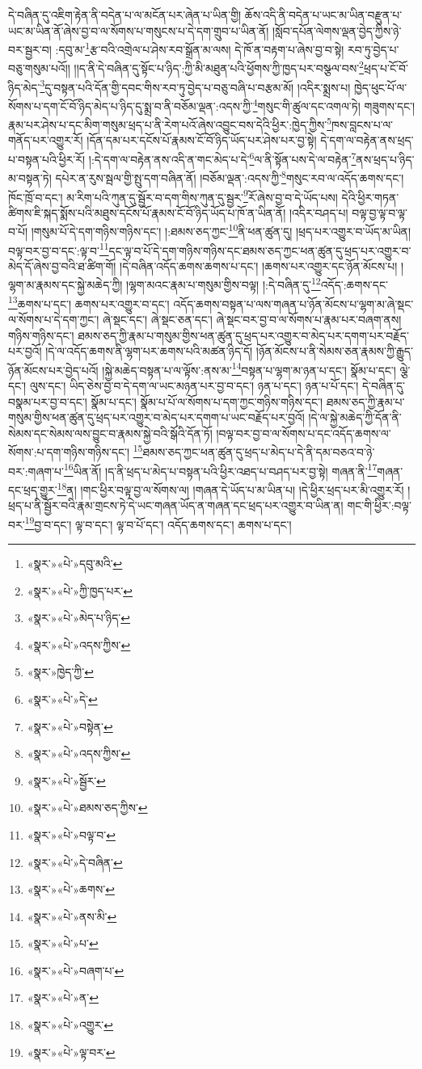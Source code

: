 དེ་བཞིན་དུ་འཇིག་རྟེན་ནི་བདེན་པ་ལ་མངོན་པར་ཞེན་པ་ཡིན་གྱི། ཆོས་འདི་ནི་བདེན་པ་ཡང་མ་ཡིན་བརྫུན་པ་ཡང་མ་ཡིན་ནོ་ཞེས་བྱ་བ་ལ་སོགས་པ་གསུངས་པ་དེ་དག་གྲུབ་པ་ཡིན་ནོ། །སློབ་དཔོན་ལེགས་ལྡན་བྱེད་ཀྱིས་ཉེ་བར་སྦྱར་བ། :དབུ་མ་\footnote{«སྣར་»«པེ་»དབུ་མའི་}རྩ་བའི་འགྲེལ་པ་ཤེས་རབ་སྒྲོན་མ་ལས། དེ་ཁོ་ན་བརྟག་པ་ཞེས་བྱ་བ་སྟེ། རབ་ཏུ་བྱེད་པ་བཅུ་གསུམ་པའོ།། །།ད་ནི་དེ་བཞིན་དུ་སྟོང་པ་ཉིད་:ཀྱི་མི་མཐུན་པའི་ཕྱོགས་ཀྱི་ཁྱད་པར་བསྩལ་བས་\footnote{«སྣར་»«པེ་»ཀྱི་ཁྱད་པར་}ཕྲད་པ་ངོ་བོ་ཉིད་མེད་\footnote{«སྣར་»«པེ་»མེད་པ་ཉིད་}དུ་བསྟན་པའི་དོན་གྱི་དབང་གིས་རབ་ཏུ་བྱེད་པ་བཅུ་བཞི་པ་བརྩམ་མོ། །འདིར་སྨྲས་པ། ཁྱེད་ཕུང་པོ་ལ་སོགས་པ་དག་ངོ་བོ་ཉིད་མེད་པ་ཉིད་དུ་སྨྲ་བ་ནི་བཅོམ་ལྡན་:འདས་ཀྱི་\footnote{«སྣར་»«པེ་»འདས་ཀྱིས་}གསུང་གི་ཚུལ་དང་འགལ་ཏེ། གཟུགས་དང་། རྣམ་པར་ཤེས་པ་དང་མིག་གསུམ་ཕྲད་པ་ནི་རེག་པའོ་ཞེས་འབྱུང་བས་དེའི་ཕྱིར་:ཁྱེད་ཀྱིས་\footnote{«སྣར་»ཁྱེད་ཀྱི་}ཁས་བླངས་པ་ལ་གནོད་པར་འགྱུར་རོ། །དོན་དམ་པར་དངོས་པོ་རྣམས་ངོ་བོ་ཉིད་ཡོད་པར་ཤེས་པར་བྱ་སྟེ། དེ་དག་ལ་བརྟེན་ནས་ཕྲད་པ་བསྟན་པའི་ཕྱིར་རོ། །:དེ་དག་ལ་བརྟེན་ནས་འདི་ན་གང་མེད་པ་དེ་\footnote{«སྣར་»«པེ་»དེ་}ལ་ནི་སྟོན་པས་དེ་ལ་བརྟེན་\footnote{«སྣར་»«པེ་»བསྟེན་}ནས་ཕྲད་པ་ཉིད་མ་བསྟན་ཏེ། དཔེར་ན་རུས་སྦལ་གྱི་སྤུ་དག་བཞིན་ནོ། །བཅོམ་ལྡན་:འདས་ཀྱི་\footnote{«སྣར་»«པེ་»འདས་ཀྱིས་}གསུང་རབ་ལ་འདོད་ཆགས་དང་། ཁོང་ཁྲོ་བ་དང་། མ་རིག་པའི་ཀུན་དུ་སྦྱོར་བ་དག་གིས་ཀུན་དུ་སྦྱར་\footnote{«སྣར་»«པེ་»སྦྱོར་}རོ་ཞེས་བྱ་བ་དེ་ཡོད་པས། དེའི་ཕྱིར་གཏན་ཚིགས་ཇི་སྐད་སྨོས་པའི་མཐུས་དངོས་པོ་རྣམས་ངོ་བོ་ཉིད་ཡོད་པ་ཁོ་ན་ཡིན་ནོ། །འདིར་བཤད་པ། བལྟ་བྱ་ལྟ་བ་ལྟ་བ་པོ། །གསུམ་པོ་དེ་དག་གཉིས་གཉིས་དང་། །:ཐམས་ཅད་ཀྱང་\footnote{«སྣར་»«པེ་»ཐམས་ཅད་ཀྱིས་}ནི་ཕན་ཚུན་དུ། །ཕྲད་པར་འགྱུར་བ་ཡོད་མ་ཡིན། བལྟ་བར་བྱ་བ་དང་:ལྟ་བ་\footnote{«སྣར་»«པེ་»བལྟ་བ་}དང་ལྟ་བ་པོ་དེ་དག་གཉིས་གཉིས་དང་ཐམས་ཅད་ཀྱང་ཕན་ཚུན་དུ་ཕྲད་པར་འགྱུར་བ་མེད་དོ་ཞེས་བྱ་བའི་ཐ་ཚིག་གོ། །དེ་བཞིན་འདོད་ཆགས་ཆགས་པ་དང་། །ཆགས་པར་འགྱུར་དང་ཉོན་མོངས་པ། །ལྷག་མ་རྣམས་དང་སྐྱེ་མཆེད་ཀྱི། །ལྷག་མའང་རྣམ་པ་གསུམ་གྱིས་བལྟ། །:དེ་བཞིན་དུ་\footnote{«སྣར་»«པེ་»དེ་བཞིན་}འདོད་:ཆགས་དང་\footnote{«སྣར་»«པེ་»ཆགས་}ཆགས་པ་དང་། ཆགས་པར་འགྱུར་བ་དང་། འདོད་ཆགས་བསྟན་པ་ལས་གཞན་པ་ཉོན་མོངས་པ་ལྷག་མ་ཞེ་སྡང་ལ་སོགས་པ་དེ་དག་ཀྱང་། ཞེ་སྡང་དང་། ཞེ་སྡང་ཅན་དང་། ཞེ་སྡང་བར་བྱ་བ་ལ་སོགས་པ་རྣམ་པར་བཞག་ནས། གཉིས་གཉིས་དང་། ཐམས་ཅད་ཀྱི་རྣམ་པ་གསུམ་གྱིས་ཕན་ཚུན་དུ་ཕྲད་པར་འགྱུར་བ་མེད་པར་དགག་པར་བརྗོད་པར་བྱའོ། །དེ་ལ་འདོད་ཆགས་ནི་ལྷག་པར་ཆགས་པའི་མཚན་ཉིད་དོ། །ཉོན་མོངས་པ་ནི་སེམས་ཅན་རྣམས་ཀྱི་རྒྱུད་ཉོན་མོངས་པར་བྱེད་པའོ། །སྐྱེ་མཆེད་བསྟན་པ་ལ་ལྟོས་:ནས་མ་\footnote{«སྣར་»«པེ་»ནས་མི་}བསྟན་པ་ལྷག་མ་ཉན་པ་དང་། སྣོམ་པ་དང་། ལྕེ་དང་། ལུས་དང་། ཡིད་ཅེས་བྱ་བ་དེ་དག་ལ་ཡང་མཉན་པར་བྱ་བ་དང་། ཉན་པ་དང་། ཉན་པ་པོ་དང་། དེ་བཞིན་དུ་བསྣམ་པར་བྱ་བ་དང་། སྣོམ་པ་དང་། སྣོམ་པ་པོ་ལ་སོགས་པ་དག་ཀྱང་གཉིས་གཉིས་དང་། ཐམས་ཅད་ཀྱི་རྣམ་པ་གསུམ་གྱིས་ཕན་ཚུན་དུ་ཕྲད་པར་འགྱུར་བ་མེད་པར་དགག་པ་ཡང་བརྗོད་པར་བྱའོ། །དེ་ལ་སྐྱེ་མཆེད་ཀྱི་དོན་ནི་སེམས་དང་སེམས་ལས་བྱུང་བ་རྣམས་སྐྱེ་བའི་སྒོའི་དོན་ཏོ། །བལྟ་བར་བྱ་བ་ལ་སོགས་པ་དང་འདོད་ཆགས་ལ་སོགས་:པ་དག་གཉིས་གཉིས་དང་། \footnote{«སྣར་»«པེ་»པ་}ཐམས་ཅད་ཀྱང་ཕན་ཚུན་དུ་ཕྲད་པ་མེད་པ་དེ་ནི་དམ་བཅའ་བ་ཉེ་བར་:གཞག་པ་\footnote{«སྣར་»«པེ་»བཞག་པ་}ཡིན་ནོ། །ད་ནི་ཕྲད་པ་མེད་པ་བསྟན་པའི་ཕྱིར་འཐད་པ་བཤད་པར་བྱ་སྟེ། གཞན་ནི་\footnote{«སྣར་»«པེ་»ན་}གཞན་དང་ཕྲད་གྱུར་\footnote{«སྣར་»«པེ་»འགྱུར་}ན། །གང་ཕྱིར་བལྟ་བྱ་ལ་སོགས་ལ། །གཞན་དེ་ཡོད་པ་མ་ཡིན་པ། །དེ་ཕྱིར་ཕྲད་པར་མི་འགྱུར་རོ། །ཕྲད་པ་ནི་སྦྱོར་བའི་རྣམ་གྲངས་ཏེ་དེ་ཡང་གཞན་ཡོད་ན་གཞན་དང་ཕྲད་པར་འགྱུར་བ་ཡིན་ན། གང་གི་ཕྱིར་:བལྟ་བར་\footnote{«སྣར་»«པེ་»ལྟ་བར་}བྱ་བ་དང་། ལྟ་བ་དང་། ལྟ་བ་པོ་དང་། འདོད་ཆགས་དང་། ཆགས་པ་དང་། 